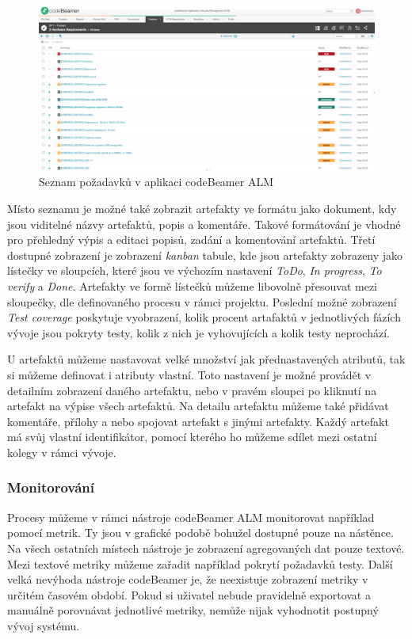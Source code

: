 \documentclass[czech,master,public,dept460,male,cpdeclaration,oneside]{diploma}
\begin{document}
\begin{figure}[!ht]
    \centering
    \includegraphics[width=1\textwidth]{Diplomka/Figures/codebeamer_requirments.png}
    \caption{Seznam požadavků v aplikaci codeBeamer ALM}
    \label{fig:codebeamer_requirments}
\end{figure}

Místo seznamu je možné také zobrazit artefakty ve formátu jako dokument, kdy jsou viditelné názvy artefaktů, popis a komentáře. Takové formátování je vhodné pro přehledný výpis a editaci popisů, zadání a komentování artefaktů. Třetí dostupné zobrazení je zobrazení \textit{kanban} tabule, kde jsou artefakty zobrazeny jako lístečky ve sloupcích, které jsou ve výchozím nastavení \textit{ToDo}, \textit{In progress}, \textit{To verify} a \textit{Done}. Artefakty ve formě lístečků můžeme libovolně přesouvat mezi sloupečky, dle definovaného procesu v rámci projektu. Poslední možné zobrazení \textit{Test coverage} poskytuje vyobrazení, kolik procent artafaktů v jednotlivých fázích vývoje jsou pokryty testy, kolik z nich je vyhovujících a kolik testy neprochází. 

U artefaktů můžeme nastavovat velké množství jak přednastavených atributů, tak si můžeme definovat i atributy vlastní. Toto nastavení je možné provádět v detailním zobrazení daného artefaktu, nebo v pravém sloupci po kliknutí na artefakt na výpise všech artefaktů. Na detailu artefaktu můžeme také přidávat komentáře, přílohy a nebo spojovat artefakt s jinými artefakty. Každý artefakt má svůj vlastní identifikátor, pomocí kterého ho můžeme sdílet mezi ostatní kolegy v rámci vývoje. 

\subsubsection{Monitorování}
Procesy můžeme v rámci nástroje codeBeamer ALM monitorovat například pomocí metrik. Ty jsou v grafické podobě bohužel dostupné pouze na nástěnce. Na všech ostatních místech nástroje je zobrazení agregovaných dat pouze textové. Mezi textové metriky můžeme zařadit například pokrytí požadavků testy. Další velká nevýhoda nástroje codeBeamer je, že neexistuje zobrazení metriky v určitém časovém období. Pokud si uživatel nebude pravidelně exportovat a manuálně porovnávat jednotlivé metriky, nemůže nijak vyhodnotit postupný vývoj systému. 
\end{document}

